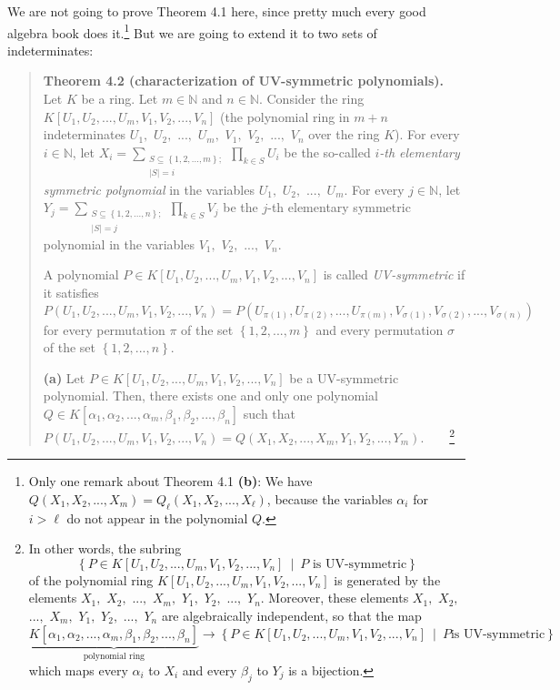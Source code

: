 \documentclass[12pt,final,notitlepage,onecolumn,german]{article}%
\begin{document}
We are not going to prove Theorem 4.1 here, since pretty much every good
algebra book does it.\footnote{Only one remark about Theorem 4.1 \textbf{(b)}:
We have $Q\left(  X_{1},X_{2},...,X_{m}\right)  =Q_{\ell}\left(  X_{1}%
,X_{2},...,X_{\ell}\right)  $, because the variables $\alpha_{i}$ for $i>\ell$
do not appear in the polynomial $Q$.} But we are going to extend it to two
sets of indeterminates:

\begin{quote}
\textbf{Theorem 4.2 (characterization of UV-symmetric polynomials).} Let $K$
be a ring. Let $m\in\mathbb{N}$ and $n\in\mathbb{N}$. Consider the ring
$K\left[  U_{1},U_{2},...,U_{m},V_{1},V_{2},...,V_{n}\right]  $ (the
polynomial ring in $m+n$ indeterminates $U_{1},$ $U_{2},$ $...,$ $U_{m},$
$V_{1},$ $V_{2},$ $...,$ $V_{n}$ over the ring $K$). For every $i\in
\mathbb{N}$, let $X_{i}=\sum\limits_{\substack{S\subseteq\left\{
1,2,...,m\right\}  ;\\\left\vert S\right\vert =i}}\prod\limits_{k\in S}U_{i}$
be the so-called $i$\textit{-th elementary symmetric polynomial} in the
variables $U_{1},$ $U_{2},$ $...,$ $U_{m}$. For every $j\in\mathbb{N}$, let
$Y_{j}=\sum\limits_{\substack{S\subseteq\left\{  1,2,...,n\right\}
;\\\left\vert S\right\vert =j}}\prod\limits_{k\in S}V_{j}$ be the $j$-th
elementary symmetric polynomial in the variables $V_{1},$ $V_{2},$ $...,$
$V_{n}$.

A polynomial $P\in K\left[  U_{1},U_{2},...,U_{m},V_{1},V_{2},...,V_{n}%
\right]  $ is called \textit{UV-symmetric} if it satisfies%
\[
P\left(  U_{1},U_{2},...,U_{m},V_{1},V_{2},...,V_{n}\right)  =P\left(
U_{\pi\left(  1\right)  },U_{\pi\left(  2\right)  },...,U_{\pi\left(
m\right)  },V_{\sigma\left(  1\right)  },V_{\sigma\left(  2\right)
},...,V_{\sigma\left(  n\right)  }\right)
\]
for every permutation $\pi$ of the set $\left\{  1,2,...,m\right\}  $ and
every permutation $\sigma$ of the set $\left\{  1,2,...,n\right\}  $.

\textbf{(a)} Let $P\in K\left[  U_{1},U_{2},...,U_{m},V_{1},V_{2}%
,...,V_{n}\right]  $ be a UV-symmetric polynomial. Then, there exists one and
only one polynomial $Q\in K\left[  \alpha_{1},\alpha_{2},...,\alpha_{m}%
,\beta_{1},\beta_{2},...,\beta_{n}\right]  $ such that $P\left(  U_{1}%
,U_{2},...,U_{m},V_{1},V_{2},...,V_{n}\right)  =Q\left(  X_{1},X_{2}%
,...,X_{m},Y_{1},Y_{2},...,Y_{m}\right)  $.\ \ \ \ \footnote{In other words,
the subring%
\[
\left\{  P\in K\left[  U_{1},U_{2},...,U_{m},V_{1},V_{2},...,V_{n}\right]
\ \mid\ P\text{ is UV-symmetric}\right\}
\]
of the polynomial ring $K\left[  U_{1},U_{2},...,U_{m},V_{1},V_{2}%
,...,V_{n}\right]  $ is generated by the elements $X_{1},$ $X_{2},$ $...,$
$X_{m},$ $Y_{1},$ $Y_{2},$ $...,$ $Y_{n}$. Moreover, these elements $X_{1},$
$X_{2},$ $...,$ $X_{m},$ $Y_{1},$ $Y_{2},$ $...,$ $Y_{n}$ are algebraically
independent, so that the map%
\[
\underbrace{K\left[  \alpha_{1},\alpha_{2},...,\alpha_{m},\beta_{1},\beta
_{2},...,\beta_{n}\right]  }_{\text{polynomial ring}}\rightarrow\left\{  P\in
K\left[  U_{1},U_{2},...,U_{m},V_{1},V_{2},...,V_{n}\right]  \ \mid\ P\text{
is UV-symmetric}\right\}
\]
which maps every $\alpha_{i}$ to $X_{i}$ and every $\beta_{j}$ to $Y_{j}$ is a
bijection.}


\end{quote}
\end{document}
